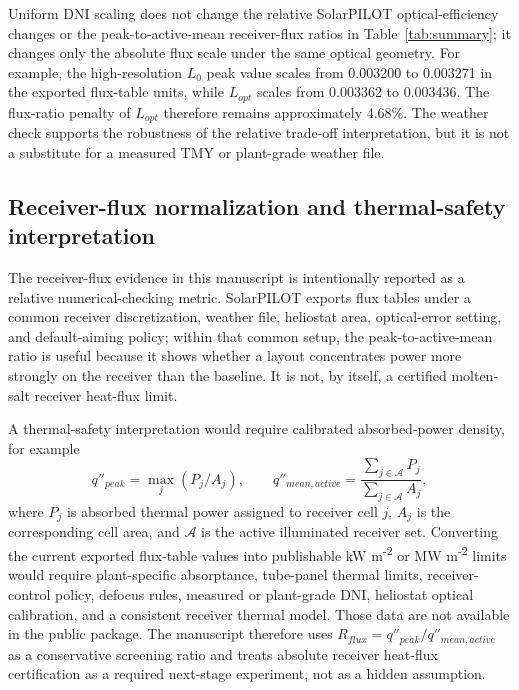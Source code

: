 \documentclass[final,3p,times]{elsarticle}
\begin{document}
Uniform DNI scaling does not change the relative SolarPILOT optical-efficiency changes or the peak-to-active-mean receiver-flux ratios in Table~\ref{tab:summary}; it changes only the absolute flux scale under the same optical geometry. For example, the high-resolution $L_0$ peak value scales from 0.003200 to 0.003271 in the exported flux-table units, while $L_{opt}$ scales from 0.003362 to 0.003436. The flux-ratio penalty of $L_{opt}$ therefore remains approximately 4.68\%. The weather check supports the robustness of the relative trade-off interpretation, but it is not a substitute for a measured TMY or plant-grade weather file.

\subsection{Receiver-flux normalization and thermal-safety interpretation}
The receiver-flux evidence in this manuscript is intentionally reported as a relative numerical-checking metric. SolarPILOT exports flux tables under a common receiver discretization, weather file, heliostat area, optical-error setting, and default-aiming policy; within that common setup, the peak-to-active-mean ratio is useful because it shows whether a layout concentrates power more strongly on the receiver than the baseline. It is not, by itself, a certified molten-salt receiver heat-flux limit.

A thermal-safety interpretation would require calibrated absorbed-power density, for example
\begin{equation}
q''_{peak}=\max_j(P_j/A_j), \qquad
q''_{mean,active}=\frac{\sum_{j\in\mathcal{A}}P_j}{\sum_{j\in\mathcal{A}}A_j},
\end{equation}
where $P_j$ is absorbed thermal power assigned to receiver cell $j$, $A_j$ is the corresponding cell area, and $\mathcal{A}$ is the active illuminated receiver set. Converting the current exported flux-table values into publishable kW m\textsuperscript{-2} or MW m\textsuperscript{-2} limits would require plant-specific absorptance, tube-panel thermal limits, receiver-control policy, defocus rules, measured or plant-grade DNI, heliostat optical calibration, and a consistent receiver thermal model. Those data are not available in the public package. The manuscript therefore uses $R_{flux}=q''_{peak}/q''_{mean,active}$ as a conservative screening ratio and treats absolute receiver heat-flux certification as a required next-stage experiment, not as a hidden assumption.
\end{document}
